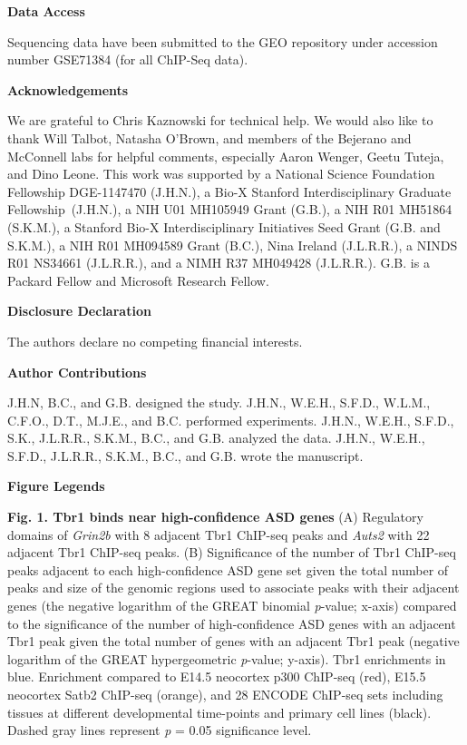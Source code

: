 \documentclass[]{article}
\begin{document}
\textbf{Data Access}

Sequencing data have been submitted to the GEO repository under
accession number GSE71384 (for all ChIP-Seq data).

\textbf{Acknowledgements}

We are grateful to Chris Kaznowski for technical help. We would also
like to thank Will Talbot, Natasha O'Brown, and members of the Bejerano
and McConnell labs for helpful comments, especially Aaron Wenger, Geetu
Tuteja, and Dino Leone. This work was supported by a National Science
Foundation Fellowship DGE-1147470 (J.H.N.), a Bio-X Stanford
Interdisciplinary Graduate Fellowship~(J.H.N.), a NIH U01 MH105949 Grant
(G.B.), a NIH R01 MH51864 (S.K.M.), a Stanford Bio-X Interdisciplinary
Initiatives Seed Grant (G.B. and S.K.M.), a NIH R01 MH094589 Grant
(B.C.), Nina Ireland (J.L.R.R.), a NINDS R01 NS34661 (J.L.R.R.), and a
NIMH R37 MH049428 (J.L.R.R.). G.B. is a Packard Fellow and Microsoft
Research Fellow.

\textbf{Disclosure Declaration}

The authors declare no competing financial interests.

\textbf{Author Contributions}

J.H.N, B.C., and G.B. designed the study. J.H.N., W.E.H., S.F.D.,
W.L.M., C.F.O., D.T., M.J.E., and B.C. performed experiments. J.H.N.,
W.E.H., S.F.D., S.K., J.L.R.R., S.K.M., B.C., and G.B. analyzed the
data. J.H.N., W.E.H., S.F.D., J.L.R.R., S.K.M., B.C., and G.B. wrote the
manuscript.\textbf{\\
}

\textbf{Figure Legends}

\textbf{Fig. 1. Tbr1 binds near high-confidence ASD genes} (A)
Regulatory domains of \emph{Grin2b} with 8 adjacent Tbr1 ChIP-seq peaks
and \emph{Auts2} with 22 adjacent Tbr1 ChIP-seq peaks. (B) Significance
of the number of Tbr1 ChIP-seq peaks adjacent to each high-confidence
ASD gene set given the total number of peaks and size of the genomic
regions used to associate peaks with their adjacent genes (the negative
logarithm of the GREAT binomial \emph{p}-value; x-axis) compared to the
significance of the number of high-confidence ASD genes with an adjacent
Tbr1 peak given the total number of genes with an adjacent Tbr1 peak
(negative logarithm of the GREAT hypergeometric \emph{p}-value; y-axis).
Tbr1 enrichments in blue. Enrichment compared to E14.5 neocortex p300
ChIP-seq (red), E15.5 neocortex Satb2 ChIP-seq (orange), and 28 ENCODE
ChIP-seq sets including tissues at different developmental time-points
and primary cell lines (black). Dashed gray lines represent \emph{p} =
0.05 significance level.
\end{document}
